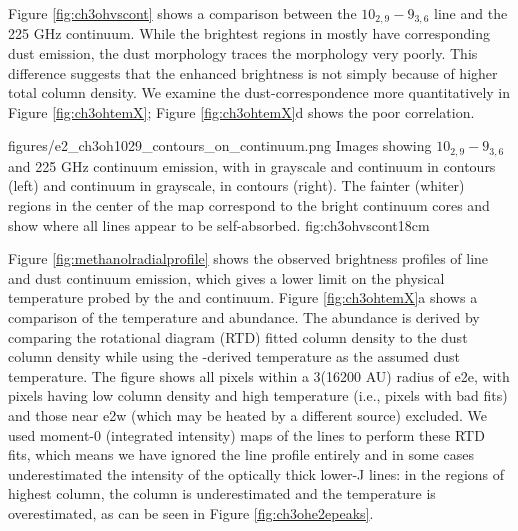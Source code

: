 \documentclass[twocolumn]{aastex61}
\begin{document}
Figure \ref{fig:ch3ohvscont} shows a comparison between the \methanol
$10_{2,9}-9_{3,6}$ line and the 225 GHz continuum.  While the brightest regions
in \methanol mostly have corresponding dust emission, the dust morphology
traces the \methanol morphology very poorly.  This difference suggests that the
enhanced brightness is not simply because of higher total column density.
We examine the dust-\methanol correspondence more quantitatively in Figure
\ref{fig:ch3ohtemX}; Figure \ref{fig:ch3ohtemX}d shows the poor correlation.

          {figures/e2_ch3oh1029_contours_on_continuum.png}
{Images showing \methanol $10_{2,9}-9_{3,6}$ and 225 GHz continuum emission,
with \methanol in grayscale and continuum in contours (left) and continuum in
grayscale, \methanol in contours (right).  The fainter (whiter) regions in the center
of the \methanol map correspond to the bright continuum cores and show where all lines
appear to be self-absorbed.}
{fig:ch3ohvscont}{1}{8cm}

Figure \ref{fig:methanolradialprofile} shows the observed brightness profiles
of \methanol line and dust continuum emission, which gives a lower limit on
the physical temperature probed by the \methanol and continuum.
Figure \ref{fig:ch3ohtemX}a shows a comparison of the \methanol temperature and
abundance.  The \methanol abundance is derived by comparing the rotational
diagram (RTD) fitted \methanol column density to the dust column density while
using the \methanol-derived temperature as the assumed dust temperature.  The
figure shows all pixels within a 3\arcsec (16200 AU) radius of e2e, with pixels
having low column density and high temperature (i.e., pixels with bad fits) and
those near e2w (which may be heated by a different source) excluded.  We used
moment-0 (integrated intensity) maps of the \methanol lines to perform these
RTD fits, which means we have ignored the line profile entirely and in some
cases underestimated the intensity of the optically thick lower-J lines: in the
regions of highest column, the column is  underestimated and the temperature is
overestimated, as can be seen in Figure \ref{fig:ch3ohe2epeaks}.  
\end{document}
